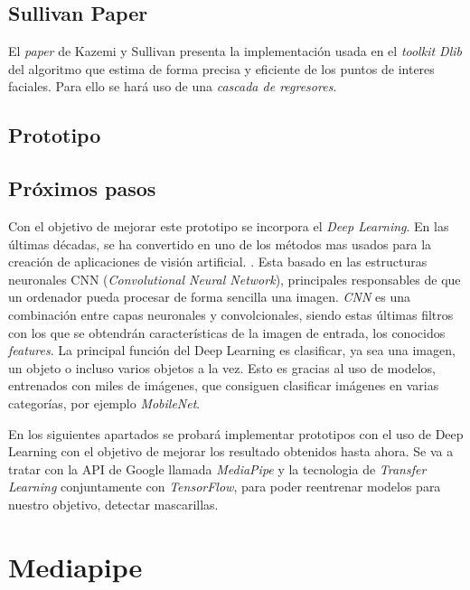\subsection*{Sullivan Paper}
El \textit{paper} de Kazemi y Sullivan presenta la implementación usada en el \textit{toolkit Dlib} del algoritmo que estima de forma precisa y eficiente de los puntos de interes faciales. Para ello se hará uso de una \textit{cascada de regresores}. \cite{faceLandmark}

\subsection*{Prototipo}

\subsection*{Próximos pasos}

Con el objetivo de mejorar este prototipo se incorpora el \textit{Deep Learning}. En las últimas décadas, se ha convertido en uno de los métodos mas usados para la creación de aplicaciones de visión artificial. \cite{szeliski_2018}. Esta basado en las estructuras neuronales CNN (\textit{Convolutional Neural Network}), principales responsables de que un ordenador pueda procesar de forma sencilla una imagen. \textit{CNN} es una combinación entre capas neuronales y convolcionales, siendo estas últimas filtros con los que se obtendrán características de la imagen de entrada, los conocidos \textit{features}. La principal función del Deep Learning es clasificar, ya sea una imagen, un objeto o incluso varios objetos a la vez. Esto es gracias al uso de modelos, entrenados con miles de imágenes, que consiguen clasificar imágenes en varias categorías, por ejemplo \textit{MobileNet}. \cite{cnn}

En los siguientes apartados se probará implementar prototipos con el uso de Deep Learning con el objetivo de mejorar los resultado obtenidos hasta ahora. Se va a tratar con la API de Google llamada \textit{MediaPipe} y la tecnologia de \textit{Transfer Learning} conjuntamente con \textit{TensorFlow}, para poder reentrenar modelos para nuestro objetivo, detectar mascarillas.

\newpage
\section{Mediapipe}


